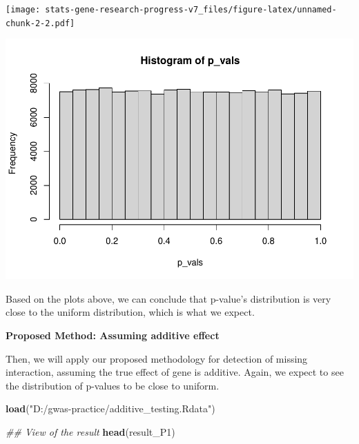 \documentclass[
]{article}
\newenvironment{Shaded}{\begin{snugshade}}{\end{snugshade}}
\newcommand{\CommentTok}[1]{\textcolor[rgb]{0.56,0.35,0.01}{\textit{#1}}}
\newcommand{\DataTypeTok}[1]{\textcolor[rgb]{0.13,0.29,0.53}{#1}}
\newcommand{\DecValTok}[1]{\textcolor[rgb]{0.00,0.00,0.81}{#1}}
\newcommand{\KeywordTok}[1]{\textcolor[rgb]{0.13,0.29,0.53}{\textbf{#1}}}
\newcommand{\NormalTok}[1]{#1}
\newcommand{\OperatorTok}[1]{\textcolor[rgb]{0.81,0.36,0.00}{\textbf{#1}}}
\newcommand{\StringTok}[1]{\textcolor[rgb]{0.31,0.60,0.02}{#1}}
\begin{document}
\texttt{[image: stats-gene-research-progress-v7\_files/figure-latex/unnamed-chunk-2-2.pdf]}

\begin{Shaded}
\end{Shaded}

\includegraphics{stats-gene-research-progress-v7_files/figure-latex/unnamed-chunk-2-3.pdf}

Based on the plots above, we can conclude that p-value's distribution is
very close to the uniform distribution, which is what we expect.

\clearpage

\textbf{Proposed Method: Assuming additive effect}

Then, we will apply our proposed methodology for detection of missing
interaction, assuming the true effect of gene is additive. Again, we
expect to see the distribution of p-values to be close to uniform.

\begin{Shaded}
\begin{Highlighting}[]
\KeywordTok{load}\NormalTok{(}\StringTok{"D:/gwas-practice/additive_testing.Rdata"}\NormalTok{)}

\CommentTok{## View of the result}
\KeywordTok{head}\NormalTok{(result_P1)}
\end{Highlighting}
\end{Shaded}
\end{document}
